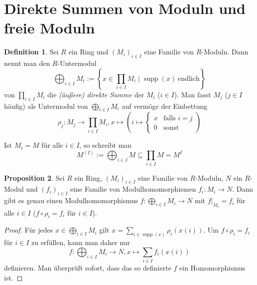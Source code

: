\documentclass[
twoside=semi,
fontsize=12,
DIV=12, 
cleardoublepage=current,
leqno,
headings=optiontoheadandtoc, 
toc=idx
]{scrbook}
\newcommand{\brac}[1]{\left( #1 \right)}
\newcommand{\set}[1]{\left\{ #1 \right\}}
\DeclareMathOperator{\supp}{supp}
\theoremstyle{definition}
\newtheorem{definition}{Definition}[section]
\newtheorem{proposition}[definition]{Proposition}
\begin{document}
	\section{Direkte Summen von Moduln und freie Moduln}
	\begin{definition}\label{1.2.1}\hfill\newline
		Sei $R$ ein Ring und $(M_i)_{i \in I}$ eine Familie von $R$-Moduln. Dann nennt man den $R$-Untermodul 
			\[\bigoplus_{i \in I} M_i := \set{x \in \prod_{i\in I}M_i \mid \supp(x)\ \mathrm{endlich} } \]
		von $\displaystyle\prod_{i\in I} M_i$ die \emph{(\"au\ss ere) direkte Summe} der $M_i$ ($i \in I$). Man fasst $M_j$ ($j \in I$ h\"aufig) als Untermodul von $\displaystyle\bigoplus_{i \in I} M_i$ auf verm\"oge der Einbettung 
		 \[\rho_j:M_j \to \prod_{i\in I} M_i, x \mapsto \brac{i \mapsto \begin{cases}
		 		x & \textrm{falls } i = j\\
		 		0 & \textrm{sonst}
		 \end{cases}}\] 
	 	
	 	\noindent Ist $M_i = M$ f\"ur alle $i \in I$, so schreibt man \[M^{(I)} := \bigoplus_{i \in I} M \subseteq \prod_{i\in I} M = M^I\]
	\end{definition}
	
	\begin{proposition}\label{1.2.2}\hfill\newline
		Sei $R$ ein Ring, $(M_i)_{i \in I}$ eine Familie von $R$-Moduln, $N$ ein $R$-Modul und $(f_i)_{i \in I}$ eine Familie von Modulhomomorphismen $f_i: M_i \to N$. Dann gibt es genau einen Modulhomomorphismus $\displaystyle f:\bigoplus_{i \in I} M_i \to N$ mit $f\big|_{M_i} = f_i$ f\"ur alle $i \in I$ ($f \circ \rho_i = f_i$ f\"ur $i \in I$).
	\end{proposition}

	\begin{proof}
		F\"ur jedes $\displaystyle x \in \bigoplus_{i \in I} M_i$ gilt $\displaystyle x = \sum_{i \in \supp(x)} \rho_i (x(i))$. Um $f \circ \rho_i = f_i$ f\"ur $i \in I$ zu erf\"ullen, kann man daher nur 
		\[f: \bigoplus_{i \in I} M_i \to N, x \mapsto \sum_{i \in I} f_i(x(i))\] 
		definieren. Man \"uberpr\"uft sofort, dass das so definierte $f$ ein Homomorphismus ist.
	\end{proof}
	
\end{document}
